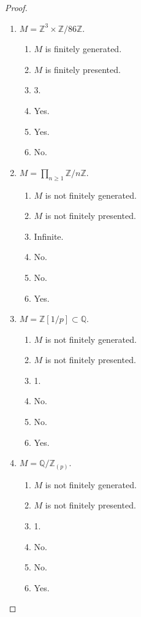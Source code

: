 \documentclass[12pt, psamsfonts]{amsart}
\theoremstyle{definition}
\theoremstyle{remark}
\numberwithin{equation}{section}
\begin{document}
\begin{proof}
$ $
  \begin{enumerate}[label=(\alph*)]
    \item 
      $M = \mathbb{Z}^3 \times \mathbb{Z} / 86\mathbb{Z}$.
      \begin{enumerate}[label=(\roman*)]
        \item 
          $M$ is finitely generated.
        \item
          $M$ is finitely presented.
        \item
          3.
        \item
          Yes.
        \item
          Yes.
        \item
          No.
      \end{enumerate}
    \item 
      $M = \prod_{n \geq 1} \mathbb{Z} / n\mathbb{Z}$.
      \begin{enumerate}[label=(\roman*)]
        \item 
          $M$ is not finitely generated.
        \item
          $M$ is not finitely presented.
        \item
          Infinite.
        \item
          No.
        \item
          No.
        \item
          Yes.
      \end{enumerate}
    \item 
      $M = \mathbb{Z}[1/p] \subset \mathbb{Q}$.
      \begin{enumerate}[label=(\roman*)]
        \item 
          $M$ is not finitely generated.
        \item
          $M$ is not finitely presented.
        \item
          1.
        \item
          No.
        \item
          No.
        \item
          Yes.
      \end{enumerate}
    \item 
      $M = \mathbb{Q} / \mathbb{Z}_{(p)}$.
      \begin{enumerate}[label=(\roman*)]
        \item 
          $M$ is not finitely generated.
        \item
          $M$ is not finitely presented.
        \item
          1.
        \item
          No.
        \item
          No.
        \item
          Yes.
      \end{enumerate}
  \end{enumerate}
\end{proof}
\end{document}
